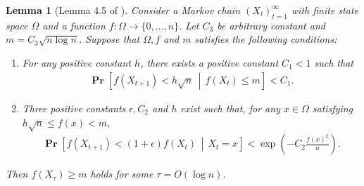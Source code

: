 \documentclass[letterpaper,11pt]{article}
\newtheorem{lemma}[theorem]{Lemma}
\renewcommand\Pr{\mathop{\mathbf{Pr}}}
\begin{document}
%
\begin{lemma}[Lemma 4.5 of \cite{AMLEFG18}] \label{lem:nazolemma}
Consider a Markov chain $(X_t)_{t=1}^\infty$ with finite state space $\Omega$ and a function $f:\Omega \to \{0,\ldots,n\}$.
Let $C_3$ be arbitrary constant and $m=C_3 \sqrt{n\log n}$.
Suppose that $\Omega,f$ and $m$ satisfies the following conditions:

\begin{enumerate}[label=$(\arabic*)$]
\item\label{state:nazo_sqrt} For any positive constant $h$, there exists a positive constant $C_1<1$ such that
\begin{align*}
\Pr\left[f(X_{t+1})<h\sqrt{n}\,\middle|\,f(X_t)\leq m\right] < C_1.
\end{align*}

\item\label{state:nazo_cher} Three positive constants $\epsilon, C_2$ and $h$ exist such that, for any $x\in \Omega$ satisfying $h\sqrt{n}\leq f(x)<m$,
\begin{align*}
\Pr\left[f(X_{t+1})< (1+\epsilon)f(X_t) \,\middle|\, X_t=x\right] < \exp\left(-C_2\frac{f(x)^2}{n}\right).
\end{align*}
\end{enumerate}

Then $f(X_\tau) \geq m$ holds for some $\tau=O(\log n)$.
\end{lemma}
\end{document}
